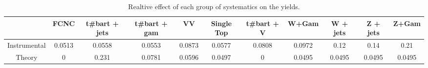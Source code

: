 \begin{table}[htbp]
\begin{center}
\begin{tabular}{|c|c|c|c|c|c|c|c|c|c|c|}
\hline 
      & FCNC      & t#bar{t} + jets      & t#bar{t} +  gam      & VV      & Single Top      & t#bar{t} + V      & W+Gam      & W + jets      & Z + jets      & Z+Gam \\ 
\hline 
 Instrumental & 0.0513 & 0.0558 & 0.0553 & 0.0873 & 0.0577 & 0.0808 & 0.0972 & 0.12 & 0.14 & 0.21 \\ 
 Theory & 0 & 0.231 & 0.0781 & 0.0596 & 0.0497 & 0 & 0.0495 & 0.0495 & 0.0495 & 0.0495 \\ 
\hline 
\end{tabular} 
\caption{Realtive effect of each group of systematics on the yields.} 
\end{center} 
\end{table} 
